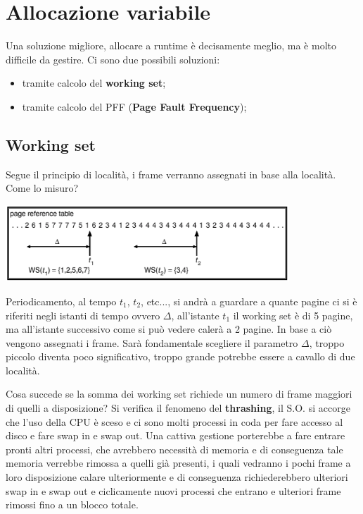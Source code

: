 \documentclass[a4paper, 12pt]{book}
\begin{document}
\section{Allocazione variabile}

Una soluzione migliore, allocare a runtime è decisamente meglio, ma è molto difficile da gestire. Ci sono due possibili soluzioni:
\begin{itemize}
    \item tramite calcolo del \textbf{working set};
    \item tramite calcolo del PFF (\textbf{Page Fault Frequency});
\end{itemize}

\subsection{Working set}

Segue il principio di località, i frame verranno assegnati in base alla località. Come lo misuro? 

\begin{center}
    \includegraphics[width=0.8\textwidth]{working_set.png}
\end{center}
Periodicamento, al tempo $t_1$, $t_2$, etc..., si andrà a guardare a quante pagine ci si è riferiti negli istanti di tempo ovvero 
$\Delta$, all'istante $t_1$ il working set è di 5 pagine, ma all'istante successivo come si può vedere calerà a 2 pagine. In base a ciò
vengono assegnati i frame. Sarà fondamentale scegliere il parametro $\Delta$, troppo piccolo diventa poco significativo, troppo 
grande potrebbe essere a cavallo di due località. 

Cosa succede se la somma dei working set richiede un numero di frame maggiori di quelli a disposizione? Si verifica il fenomeno del 
\textbf{thrashing}, il S.O. si accorge che l'uso della CPU è sceso e ci sono molti processi in coda per fare accesso al disco e fare 
swap in e swap out. Una cattiva gestione porterebbe a fare entrare pronti altri processi, che avrebbero necessità
di memoria e di conseguenza tale memoria verrebbe rimossa a quelli già presenti, i quali vedranno i pochi frame a loro disposizione 
calare ulteriormente e di conseguenza richiederebbero ulteriori swap in e swap out e ciclicamente nuovi processi che entrano e 
ulteriori frame rimossi fino a un blocco totale. 
\end{document}
